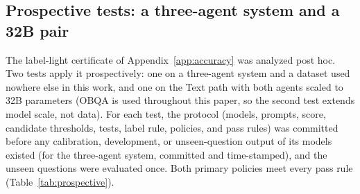 \subsection{Prospective tests: a three-agent system and a 32B pair}\label{app:prospective}\label{app:e1}\label{app:e2b}

The label-light certificate of Appendix~\ref{app:accuracy} was analyzed post hoc. Two tests apply it prospectively: one on a three-agent system and a dataset used nowhere else in this work, and one on the Text path with both agents scaled to 32B parameters (OBQA is used throughout this paper, so the second test extends model scale, not data). For each test, the protocol (models, prompts, score, candidate thresholds, tests, label rule, policies, and pass rules) was committed before any calibration, development, or unseen-question output of its models existed (for the three-agent system, committed and time-stamped), and the unseen questions were evaluated once. Both primary policies meet every pass rule (Table~\ref{tab:prospective}).

